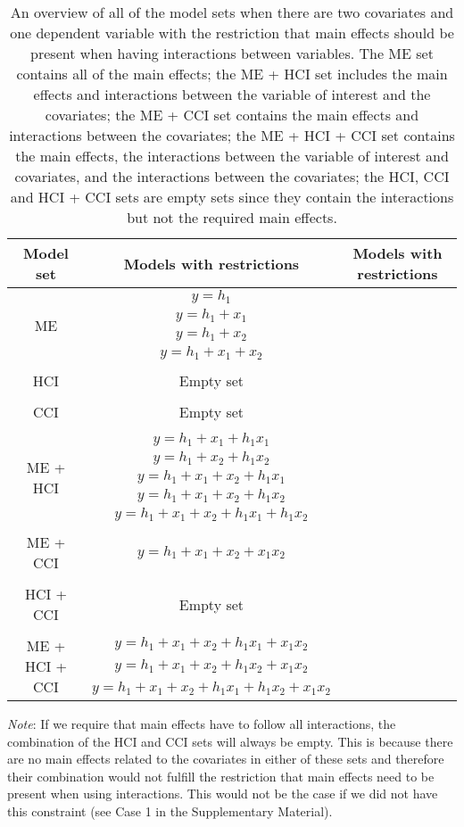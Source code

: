 \begin{table}[hbt!]
\centering
\caption{}
\caption*{\footnotesize An overview of all of the model sets when there are two covariates and one dependent variable with the restriction that main effects should be present when having interactions between variables. The ME set contains all of the main effects; the ME + HCI set includes the main effects and interactions between the variable of interest and the covariates; the ME + CCI set contains the main effects and  interactions between the covariates; the ME + HCI + CCI set contains the main effects, the interactions between the variable of interest and covariates, and the interactions between the covariates; the HCI, CCI and HCI + CCI sets are empty sets since they contain the interactions but not the required main effects.}
\label{modelsets2}
\begin{threeparttable}
\begin{tabular}{ccc}
\toprule
Model set & Models with restrictions & Models with restrictions  \\ 
\midrule
\multirow{4}{*}{ME} & $y=h_1$ \\ & $y=h_1+x_1$ \\ & $y=h_1+x_2$ \\ & $y=h_1+x_1+x_2$  \\ & \\ 
\multirow{1}{*}{HCI} & Empty set  \\& \\
CCI & Empty set  \\ & \\
\multirow{5}{*}{ME + HCI} & $y=h_1+x_1+h_1x_1$  \\ & $y=h_1+x_2+h_1x_2$  \\& $y=h_1+x_1+x_2+h_1x_1$  \\& $y=h_1+x_1+x_2+h_1x_2$  \\& $y=h_1+x_1+x_2+h_1x_1+h_1x_2$ \\ & \\
ME + CCI & $y=h_1+x_1+x_2+x_1x_2$ \\ & \\
HCI + CCI & Empty set \\ & \\
\multirow{3}{*}{ME + HCI + CCI} & $y=h_1+x_1+x_2+h_1x_1+x_1x_2$ \\ & $y=h_1+x_1+x_2+h_1x_2+x_1x_2$ \\ & $y=h_1+x_1+x_2+h_1x_1+h_1x_2+x_1x_2$ \\
\bottomrule
\end{tabular}
\begin{tablenotes}
\textit{Note}: If we require that main effects have to follow all interactions, the combination of the HCI and CCI sets will always be empty. This is because there are no main effects related to the covariates in either of these sets and therefore their combination would not fulfill the restriction that main effects need to be present when using interactions. This would not be the case if we did not have this constraint (see Case 1 in the Supplementary Material).
\end{tablenotes}
\end{threeparttable}
\end{table}
